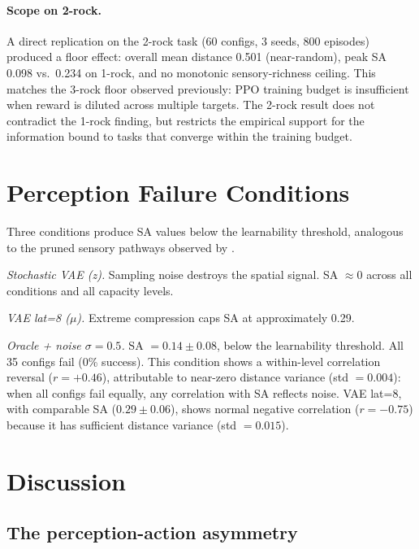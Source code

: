 \documentclass{article}
\begin{document}
\paragraph{Scope on 2-rock.}
A direct replication on the 2-rock task (60 configs, 3 seeds, 800 episodes)
produced a floor effect: overall mean distance 0.501 (near-random), peak SA
0.098 vs.\ 0.234 on 1-rock, and no monotonic sensory-richness ceiling. This
matches the 3-rock floor observed previously: PPO training budget is
insufficient when reward is diluted across multiple targets. The 2-rock
result does not contradict the 1-rock finding, but restricts the empirical
support for the information bound to tasks that converge within the training
budget.

\section{Perception Failure Conditions}
\label{sec:failure}

Three conditions produce SA values below the learnability threshold, analogous to
the pruned sensory pathways observed by \citet{blakemore1970development}.

\textit{Stochastic VAE (z).} Sampling noise destroys the spatial signal.
SA $\approx 0$ across all conditions and all capacity levels.

\textit{VAE lat=8 ($\mu$).} Extreme compression caps SA at approximately 0.29.

\textit{Oracle + noise $\sigma{=}0.5$.} SA $= 0.14 \pm 0.08$, below the
learnability threshold. All 35 configs fail (0\% success). This condition shows
a within-level correlation reversal ($r = +0.46$), attributable to near-zero
distance variance (std $= 0.004$): when all configs fail equally, any correlation
with SA reflects noise. VAE lat=8, with comparable SA ($0.29 \pm 0.06$), shows
normal negative correlation ($r = -0.75$) because it has sufficient distance
variance (std $= 0.015$).

\section{Discussion}
\label{sec:discussion}

\subsection{The perception-action asymmetry}
\end{document}

